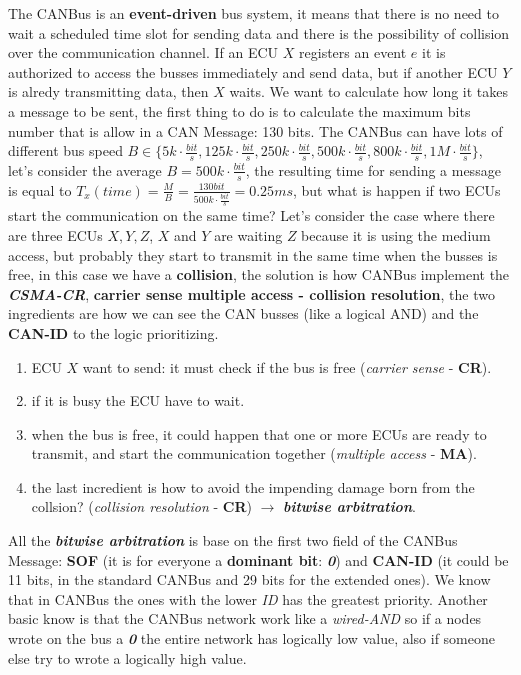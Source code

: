 The CANBus is an \textbf{event-driven} bus system, it means that there is no need to wait a scheduled time slot for sending data and there is the possibility of collision over the communication channel. If an ECU $X$ registers an event $e$ it is authorized to access the busses immediately and send data, but if another ECU $Y$ is alredy transmitting data, then $X$ waits. We want to calculate how long it takes a message to be sent, the first thing to do is to calculate the maximum bits number that is allow in a CAN Message: 130 bits. The CANBus can have lots of different bus speed $B \in \{5 k \cdot \frac{bit}{s}, 125 k \cdot \frac{bit}{s}, 250 k \cdot \frac{bit}{s}, 500 k \cdot \frac{bit}{s}, 800 k \cdot \frac{bit}{s}, 1 M \cdot \frac{bit}{s}\}$, let's consider the average $B = 500 k \cdot \frac{bit}{s}$, the resulting time for sending a message is equal to $T_x(time) = \frac{M}{B} = \frac{130 bit}{500 k \cdot \frac{bit}{s}} = 0.25 ms$, but what is happen if two ECUs start the communication on the same time? Let's consider the case where there are three ECUs $X, Y, Z$, $X$ and $Y$ are waiting $Z$ because it is using the medium access, but probably they start to transmit in the same time when the busses is free, in this case we have a \textbf{collision}, the solution is how CANBus implement the \textbf{\textit{CSMA-CR}}, \textbf{carrier sense multiple access - collision resolution}, the two ingredients are how we can see the CAN busses (like a logical AND) and the \textbf{CAN-ID} to the logic prioritizing.
\begin{enumerate}[nosep]
    \item ECU $X$ want to send: it must check if the bus is free (\textit{carrier sense} - \textbf{CR}).
    \item if it is busy the ECU have to wait.
    \item when the bus is free, it could happen that one or more ECUs are ready to transmit, and start the communication together (\textit{multiple access} - \textbf{MA}).
    \item the last incredient is how to avoid the impending damage born from the collsion? (\textit{collision resolution} - \textbf{CR}) $\rightarrow$ \textbf{\textit{bitwise arbitration}}.
\end{enumerate}

All the \textbf{\textit{bitwise arbitration}} is base on the first two field of the CANBus Message: \textbf{SOF} (it is for everyone a \textbf{dominant bit}: \textbf{\textit{0}}) and \textbf{CAN-ID} (it could be 11 bits, in the standard CANBus and 29 bits for the extended ones). We know that in CANBus the ones with the lower \textit{ID} has the greatest priority. Another basic know is that the CANBus network work like a \textit{wired-AND} so if a nodes wrote on the bus a \textbf{\textit{0}} the entire network has logically low value, also if someone else try to wrote a logically high value.

